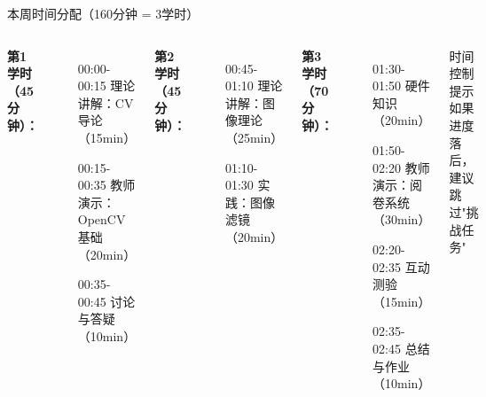 \documentclass[aspectratio=169, 12pt]{beamer}
\begin{document}
\begin{frame}{本周时间分配（160分钟 = 3学时）}
    \begin{columns}
        \textbf{第1学时（45分钟）：}
        \begin{itemize}
            \item[00:00-00:15] 理论讲解：CV导论（15min）
            \item[00:15-00:35] 教师演示：OpenCV基础（20min）
            \item[00:35-00:45] 讨论与答疑（10min）
        \end{itemize}

        \textbf{第2学时（45分钟）：}
        \begin{itemize}
            \item[00:45-01:10] 理论讲解：图像理论（25min）
            \item[01:10-01:30] 实践：图像滤镜（20min）
        \end{itemize}

        \textbf{第3学时（70分钟）：}
        \begin{itemize}
            \item[01:30-01:50] 硬件知识（20min）
            \item[01:50-02:20] 教师演示：阅卷系统（30min）
            \item[02:20-02:35] 互动测验（15min）
            \item[02:35-02:45] 总结与作业（10min）
        \end{itemize}

        \vspace{0.5cm}
        \begin{alertblock}{时间控制提示}
        如果进度落后，建议跳过"挑战任务"
        \end{alertblock}
    \end{columns}
\end{frame}
\end{document}
